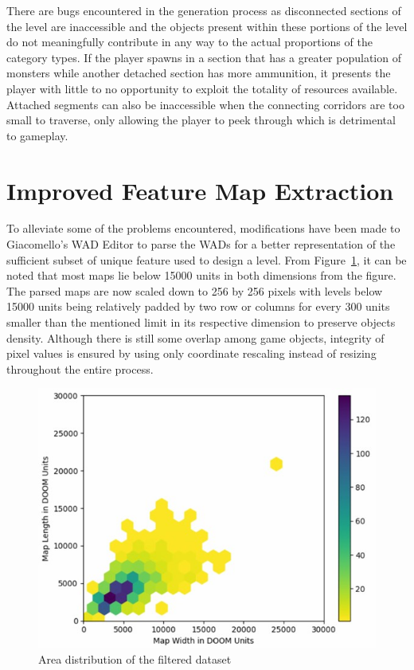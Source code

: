 \documentclass{Configuration_Files/PoliMi3i_thesis}
\begin{document}
There are bugs encountered in the generation process as disconnected sections of the 
level are inaccessible and the objects present within these portions of the level do not 
meaningfully contribute in any way to the actual proportions of the category types. If 
the player spawns in a section that has a greater population of monsters while 
another detached section has more ammunition, it presents the player with little to 
no opportunity to exploit the totality of resources available. Attached segments can 
also be inaccessible when the connecting corridors are too small to traverse, only 
allowing the player to peek through which is detrimental to gameplay.

\section{Improved Feature Map Extraction}
To alleviate some of the problems encountered, modifications have been made to
Giacomello’s WAD Editor to parse the WADs for a better representation of the
sufficient subset of unique feature used to design a level. From  Figure~\ref{fig:areadist}, it can be 
noted that most maps lie below 15000 units in both dimensions from the figure. The 
parsed maps are now scaled down to 256 by 256 pixels with levels below 15000 units 
being relatively padded by two row or columns for every 300 units smaller than the 
mentioned limit in its respective dimension to preserve objects density. Although 
there is still some overlap among game objects, integrity of pixel values is ensured by 
using only coordinate rescaling instead of resizing throughout the entire process.
\begin{figure}[H]
    \centering
    \includegraphics[width=1\textwidth]{area_distribution.jpg}
    \caption[Area distribution of the filtered dataset]{Area distribution of the filtered dataset}
    \label{fig:areadist}
\end{figure}
\end{document}
